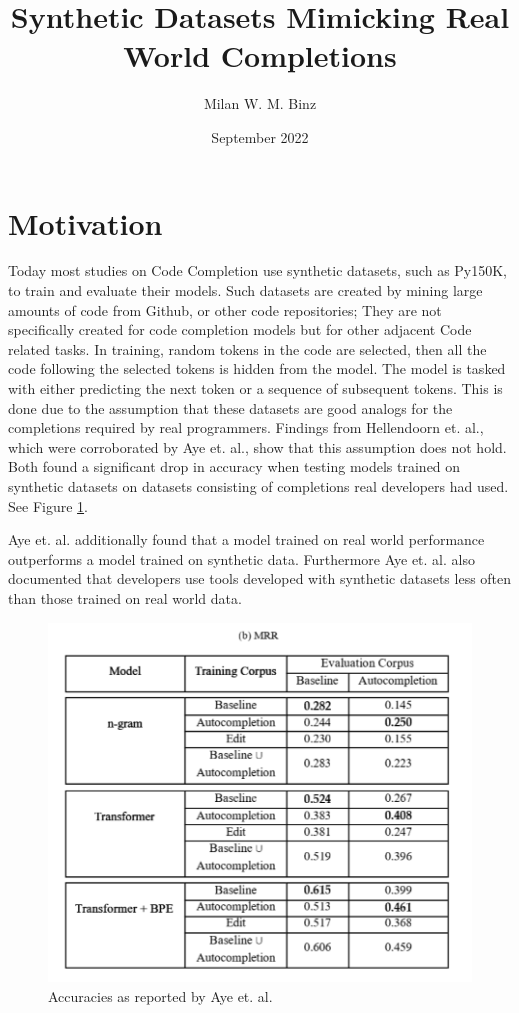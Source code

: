 \documentclass[sigplan,screen,9pt]{acmart}
\title{Synthetic Datasets Mimicking Real World Completions}
\author{Milan W. M. Binz}
\date{September 2022}
\begin{document}
\maketitle

\section{Motivation}
Today most studies on Code Completion use synthetic datasets, such as Py150K, to train and evaluate their models.
Such datasets are created by mining large amounts of code from Github, or other code repositories; They are not specifically created for code completion models but for other adjacent Code related tasks.
In training, random tokens in the code are selected, then all the code following the selected tokens is hidden from the model. The model is tasked with either predicting the next token or a sequence of subsequent tokens.
This is done due to the assumption that these datasets are good analogs for the completions required by real programmers.
Findings from Hellendoorn et. al.\cite{8812116}, which were corroborated by Aye et. al.\cite{https://doi.org/10.48550/arxiv.2011.04542}, show that this assumption does not hold.
Both found a significant drop in accuracy when testing models trained on synthetic datasets on datasets consisting of completions real developers had used. 
See Figure \ref{fig:accuracies}.

Aye et. al.\cite{https://doi.org/10.48550/arxiv.2011.04542} additionally found that a model trained on real world performance outperforms a model trained on synthetic data. 
Furthermore Aye et. al.\cite{https://doi.org/10.48550/arxiv.2011.04542} also documented that developers use tools developed with synthetic datasets less often than those trained on real world data.


\begin{figure}
    \centering
    \includegraphics[scale = 0.33]{accuracies.png}
    \caption{Accuracies as reported by Aye et. al.
    \cite{https://doi.org/10.48550/arxiv.2011.04542}}
    \label{fig:accuracies}
\end{figure}
\end{document}
